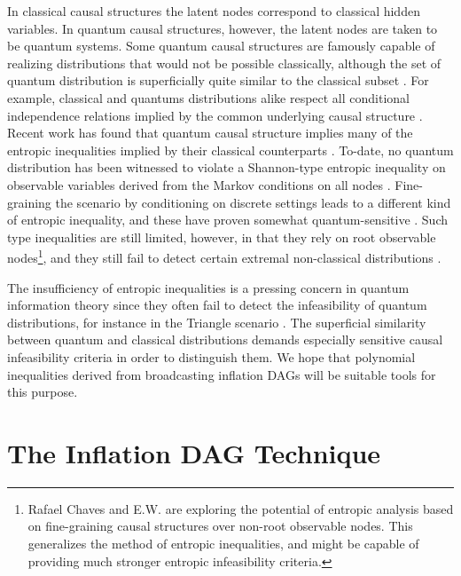 {In classical causal structures the latent nodes correspond to classical hidden variables. In quantum causal structures, however, the latent nodes are taken to be quantum systems. Some quantum causal structures are famously capable of realizing distributions that would not be possible classically, although the set of quantum distribution is superficially quite similar to the classical subset \cite{pusey2014gdag,fritz2012bell}. For example, classical and quantums distributions alike respect all conditional independence relations implied by the common underlying causal structure \cite{pusey2014gdag}. Recent work has found that quantum causal structure implies many of the entropic inequalities implied by their classical counterparts \cite{pusey2014gdag,Chaves2015infoquantum,ChavesNoSignalling}. To-date, no quantum distribution has been witnessed to violate a Shannon-type entropic inequality on observable variables derived from the Markov conditions on all nodes \cite{chaves2012entropic,fritz2012bell}. Fine-graining the scenario by conditioning on discrete settings leads to a different kind of entropic inequality, and these have proven somewhat quantum-sensitive \cite{braunstein1988entropic,SchumacherInequality,chaves2014novel}. Such \citet{braunstein1988entropic} type inequalities are still limited, however, in that they rely on root observable nodes\footnote{Rafael Chaves and E.W. are exploring the potential of entropic analysis based on fine-graining causal structures over non-root observable nodes. This generalizes the method of entropic inequalities, and might be capable of providing much stronger entropic infeasibility criteria.}, and they still fail to detect certain extremal non-classical distributions \cite{chaves2014novel,fritz2012bell}.  

The insufficiency of entropic inequalities is a pressing concern in quantum information theory since they often fail to detect the infeasibility of quantum distributions, for instance in the Triangle scenario \citep[Prob. 2.17]{fritz2012bell}. The superficial similarity between quantum and classical distributions demands especially sensitive causal infeasibility criteria in order to distinguish them. We hope that polynomial inequalities derived from broadcasting inflation DAGs will be suitable tools for this purpose.


\section{The Inflation DAG Technique}\label{sec:mainalgorithm}

}
